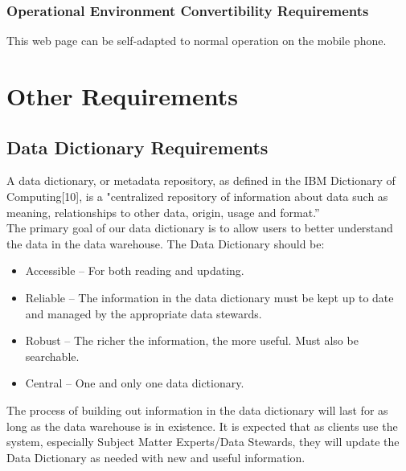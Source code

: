 \documentclass[16pt]{scrreprt}
\begin{document}
\subsection{Operational Environment Convertibility Requirements}
This web page can be self-adapted to normal operation on the mobile phone.


\chapter{Other Requirements}
\label{Other Requirements}

\section{Data Dictionary Requirements}
A data dictionary, or metadata repository, as defined in the IBM Dictionary of Computing[10], is a "centralized repository of information about data such as meaning, relationships to other data, origin, usage and format.”\\

\noindent The primary goal of our data dictionary is to allow users to better understand the data in the data
warehouse. 
The Data Dictionary should be:
\begin{itemize}
	\item Accessible – For both reading and updating.
\item Reliable – The information in the data dictionary must be kept up to date and managed by the appropriate data stewards.
\item Robust – The richer the information, the more useful. Must also be searchable.
\item Central – One and only one data dictionary.
\end{itemize}
The process of building out information in the data dictionary will last for as long as the data warehouse is in existence. It is expected that as clients use the system, especially Subject Matter Experts/Data Stewards, they will update the Data Dictionary as needed with new and useful information.
\end{document}
